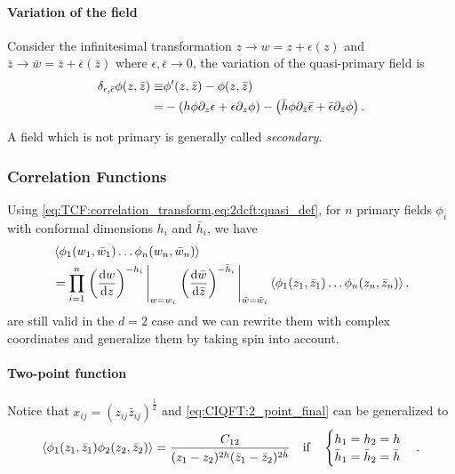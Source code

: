 \documentclass[10pt]{article}
\begin{document}
\paragraph{Variation of the field}
Consider the infinitesimal transformation $z\to w=z+\epsilon(z)$ and $\bar{z}\to\bar{w}=\bar{z}+\bar{\epsilon}(\bar{z})$ where $\epsilon,\bar{\epsilon}\to0$, the variation of the quasi-primary field is
\begin{align}
    \delta_{\epsilon,\bar{\epsilon}}\phi(z,\bar{z})\equiv & \phi'(z,\bar{z})-\phi(z,\bar{z})\notag                                                                                                                                                            \\
    =                                                     & -\left(h\phi\partial_z\epsilon+\epsilon\partial_z\phi\right)-\left(\bar{h}\phi\partial_{\bar{z}}\bar{\epsilon}+\bar{\epsilon}\partial_{\bar{z}}\phi\right).\label{eq:2dcft:primary_infinitesimal}
\end{align}

A field which is not primary is generally called \textit{secondary}.


\subsubsection{Correlation Functions}
Using \cref{eq:TCF:correlation_transform,eq:2dcft:quasi_def}, for $n$ primary fields $\phi_i$ with conformal dimensions $h_i$ and $\bar{h}_i$, we have
\begin{align}
     & \expval{\phi_1(w_1,\bar{w}_1)\dots\phi_n(w_n,\bar{w}_n)}\notag                                                                                                                                \\
     & =\prod_{i=1}^n\eval{\left(\dv{w}{z}\right)^{-h_i}}_{w=w_i}\eval{\left(\dv{\bar{w}}{\bar{z}}\right)^{-\bar{h}_i}}_{\bar{w}=\bar{w}_i}\expval{\phi_1(z_1,\bar{z}_1)\dots\phi_n(z_n,\bar{z}_n)}.
\end{align}
 are still valid in the $d=2$ case and we can rewrite them with complex coordinates and generalize them by taking spin into account.
\paragraph{Two-point function}
Notice that $x_{ij}=\left(z_{ij}\bar{z}_{ij}\right)^{\frac{1}{2}}$ and \cref{eq:CIQFT:2_point_final} can be generalized to
\begin{align}
    \expval{\phi_1(z_1,\bar{z}_1)\phi_2(z_2,\bar{z}_2)}=\frac{C_{12}}{(z_1-z_2)^{2h}(\bar{z}_1-\bar{z}_2)^{2\bar{h}}}\qif \begin{cases}
                                                                                                                              h_1=h_2=h \\\bar{h}_1=\bar{h}_2=\bar{h}
                                                                                                                          \end{cases}.
\end{align}
\end{document}
